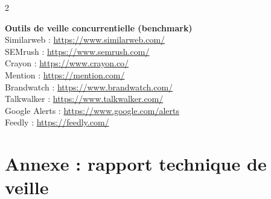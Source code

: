 \documentclass[12pt,a4paper,openany]{report}
\begin{document}
\begin{multicols}{2}
\vspace{0.3cm}

\textbf{\color{ensaBlue}Outils de veille concurrentielle (benchmark)}\\
Similarweb : \url{https://www.similarweb.com/}\\
SEMrush : \url{https://www.semrush.com/}\\
Crayon : \url{https://www.crayon.co/}\\
Mention : \url{https://mention.com/}\\
Brandwatch : \url{https://www.brandwatch.com/}\\
Talkwalker : \url{https://www.talkwalker.com/}\\
Google Alerts : \url{https://www.google.com/alerts}\\
Feedly : \url{https://feedly.com/}

\end{multicols}

\chapter*{Annexe : rapport technique de veille}

\end{document}
